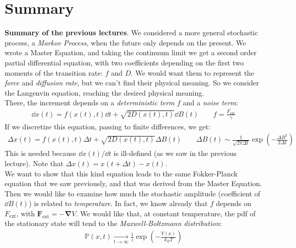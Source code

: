 \documentclass[../template.tex]{subfiles}
\begin{document}
\section{Summary}
\textbf{Summary of the previous lectures}. We considered a more general stochastic process, a \textit{Markov Process}, when the future only depends on the present. We wrote a Master Equation, and taking the continuum limit we get a second order partial differential equation, with two coefficients depending on the first two moments of the transition rate: $f$ and $D$. We would want them to represent the \textit{force} and \textit{diffusion rate}, but we can't find their physical meaning. So we consider the Langenvin equation, reaching the desired physical meaning.\\
There, the increment depends on a \textit{deterministic term} $f$ and a \textit{noise term}:  
\begin{align*}
    \dd{x(t)} = f(x(t), t) \dd{t} + \sqrt{2D (x(t),t)} \dd{B(t)} \qquad f = \frac{F_{\mathrm{ext} }}{\gamma} 
\end{align*}     
If we discretize this equation, passing to finite differences, we get:
\begin{align*}
    \Delta x(t) = f(x(t),t) \Delta t + \sqrt{2 D (x(t),t)} \Delta B(t) \qquad \Delta B(t) \sim \frac{1}{\sqrt{2 \pi \Delta t}} \exp\left(-\frac{\Delta B^2}{2 \Delta t} \right)
\end{align*}
This is needed because $\dd{x(t)}/\dd{t}$ is ill-defined (as we saw in the previous lecture). Note that $\Delta x(t) = x(t+ \Delta t) - x(t)$.\\
We want to show that this kind equation leads to the same Fokker-Planck equation that we saw previously, and that was derived from the Master Equation. Then we would like to examine how much the stochastic amplitude (coefficient of $\dd{B(t)}$) is related to \textit{temperature}. In fact, we know already that $f$ depends on $F_{\mathrm{ext}}$, with $\bm{F}_{\mathrm{ext} } = -\bm{\nabla} V$. We would like that, at constant temperature, the pdf of the stationary state will tend to the \textit{Maxwell-Boltzmann distribution}: 
\begin{align*}
    \mathbb{P}(x,t)  \xrightarrow[t \to \infty]{}  \frac{1}{z} \exp\left(-\frac{V(x)}{k_B T} \right) 
\end{align*}
\end{document}
